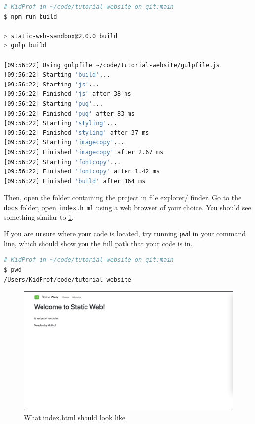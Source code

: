 \begin{lstlisting}[language=bash]
# KidProf in ~/code/tutorial-website on git:main 
$ npm run build

> static-web-sandbox@2.0.0 build
> gulp build

[09:56:22] Using gulpfile ~/code/tutorial-website/gulpfile.js
[09:56:22] Starting 'build'...
[09:56:22] Starting 'js'...
[09:56:22] Finished 'js' after 38 ms
[09:56:22] Starting 'pug'...
[09:56:22] Finished 'pug' after 83 ms
[09:56:22] Starting 'styling'...
[09:56:22] Finished 'styling' after 37 ms
[09:56:22] Starting 'imagecopy'...
[09:56:22] Finished 'imagecopy' after 2.67 ms
[09:56:22] Starting 'fontcopy'...
[09:56:22] Finished 'fontcopy' after 1.42 ms
[09:56:22] Finished 'build' after 164 ms
\end{lstlisting}
\vspace{6mm}

Then, open the folder containing the project in file explorer/ finder. Go to the \texttt{docs} folder, open \texttt{index.html} using a web browser of your choice. You should see something similar to \cref{fig:indexhtml}.

If you are unsure where your code is located, try running \texttt{pwd} in your command line, which should show you the full path that your code is in.
\vspace{6mm}

\begin{lstlisting}[language=bash]
# KidProf in ~/code/tutorial-website on git:main 
$ pwd
/Users/KidProf/code/tutorial-website
\end{lstlisting}

\begin{figure}[h]
\centering
\includegraphics[width=15cm]{images/ch1-indexhtml.png}
\caption{What index.html should look like}
\label{fig:indexhtml}
\end{figure}


